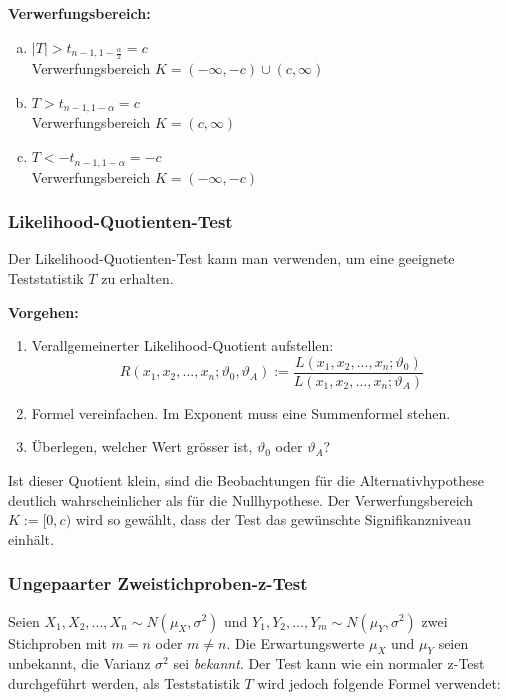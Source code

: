 \documentclass[10pt,a4paper,twocolumn]{article}
\begin{document}
\vspace{10pt}

\textbf{Verwerfungsbereich:}
\begin{enumerate}[a)]
\item $|T|>t_{n-1,1-\frac{\alpha}{2}}=c$ \\
      Verwerfungsbereich $K=(-\infty,-c) \cup (c,\infty)$
\item $T>t_{n-1,1-\alpha}=c$ \\
      Verwerfungsbereich $K=(c,\infty)$
\item $T<-t_{n-1,1-\alpha}=-c$ \\
      Verwerfungsbereich $K=(-\infty,-c)$
\end{enumerate}





\subsubsection{Likelihood-Quotienten-Test}
Der Likelihood-Quotienten-Test kann man verwenden, um eine geeignete Teststatistik $T$ zu erhalten. 

\vspace{10pt}

\textbf{Vorgehen:}
\begin{enumerate}
\item Verallgemeinerter Likelihood-Quotient aufstellen:
\[
R(x_1,x_2,...,x_n;\vartheta_0,\vartheta_A):=\frac{L(x_1,x_2,...,x_n;\vartheta_0)}{L(x_1,x_2,...,x_n;\vartheta_A)}
\]
\item Formel vereinfachen. Im Exponent muss eine Summenformel stehen.
\item Überlegen, welcher Wert grösser ist, $\vartheta_0$ oder $\vartheta_A$?                  
\end{enumerate}

Ist dieser Quotient klein, sind die Beobachtungen für die Alternativhypothese deutlich wahrscheinlicher als für die Nullhypothese. Der Verwerfungsbereich $K:=[0,c)$ wird so gewählt, dass der Test das gewünschte Signifikanzniveau einhält.

\subsubsection{Ungepaarter Zweistichproben-z-Test}
Seien $X_1,X_2,...,X_n \sim N(\mu_X,\sigma^2)$ und $Y_1,Y_2,...,Y_m \sim N(\mu_Y,\sigma^2)$ zwei Stichproben mit $m = n$ oder $m \neq n$. Die Erwartungswerte $\mu_X$ und $\mu_Y$ seien unbekannt, die Varianz $\sigma^2$ sei \emph{bekannt}. Der Test kann wie ein normaler z-Test durchgeführt werden, als Teststatistik $T$ wird jedoch folgende Formel verwendet:
\end{document}

